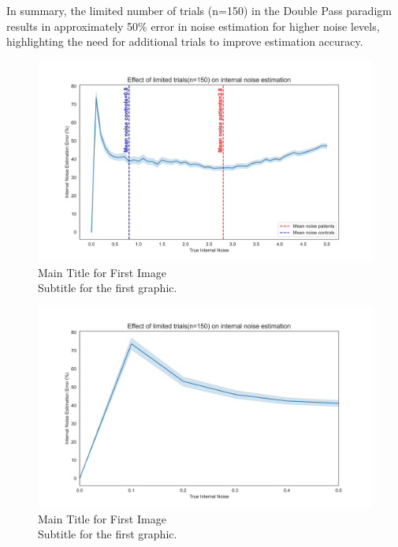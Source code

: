 In summary, the limited number of trials (n=150) in the Double Pass paradigm results in approximately 50\% error in noise estimation for higher noise levels, highlighting the need for additional trials to improve estimation accuracy.

\begin{figure}[H]
    \centering
    \includegraphics[width=15cm]{MainLayout/Images/chapter5/noise_150.jpg}
    \caption{Main Title for First Image \\ \small Subtitle for the first graphic.}
    \label{fig:noise_150}
\end{figure}

\begin{figure}[H]
    \centering
    \includegraphics[width=15cm]{MainLayout/Images/chapter5/noise_150_0to05.jpg}
    \caption{Main Title for First Image \\ \small Subtitle for the first graphic.}
    \label{fig:noise_150_0to05}
\end{figure}


